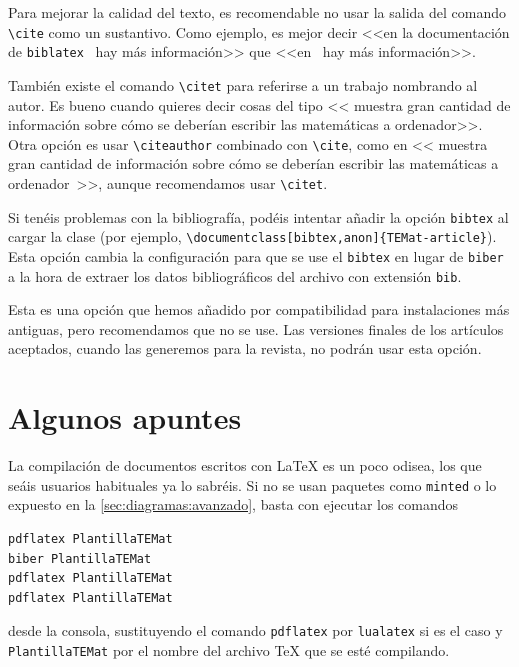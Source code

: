 \documentclass{TEMat-article}
\begin{document}
\begin{nota}
Para mejorar la calidad del texto, es recomendable no usar la salida del comando \verb+\cite+ como un sustantivo.
Como ejemplo, es mejor decir <<en la documentación de \texttt{biblatex}~\cite{biblatex} hay más información>> que <<en~\cite{biblatex} hay más información>>.

También existe el comando \verb+\citet+ para referirse a un trabajo nombrando al autor.
Es bueno cuando quieres decir cosas del tipo <<\citet{bezosOM} muestra gran cantidad de información sobre cómo se deberían escribir las matemáticas a ordenador>>. Otra opción es usar \verb+\citeauthor+ combinado con \verb+\cite+, como en <<\citeauthor{bezosOM} muestra gran cantidad de información sobre cómo se deberían escribir las matemáticas a ordenador~\cite{bezosOM}>>, aunque recomendamos usar \verb+\citet+.
\end{nota}

\begin{nota}
Si tenéis problemas con la bibliografía, podéis intentar añadir la opción \verb+bibtex+ al cargar la clase (por ejemplo, \verb+\documentclass[bibtex,anon]{TEMat-article}+).
Esta opción cambia la configuración para que se use el  \verb+bibtex+ en lugar de \verb+biber+ a la hora de extraer los datos bibliográficos del archivo con extensión \verb+bib+.

Esta es una opción que hemos añadido por compatibilidad para instalaciones más antiguas, pero recomendamos que no se use.
Las versiones finales de los artículos aceptados, cuando las generemos para la revista, no podrán usar esta opción.
\end{nota}

\section{Algunos apuntes}\label{sec:apuntes}
La compilación de documentos escritos con \LaTeX{} es un poco odisea, los que seáis usuarios habituales ya lo sabréis.
Si no se usan paquetes como \verb+minted+ o lo expuesto en la \cref{sec:diagramas:avanzado}, basta con ejecutar los comandos
\begin{verbatim}
pdflatex PlantillaTEMat
biber PlantillaTEMat
pdflatex PlantillaTEMat
pdflatex PlantillaTEMat
\end{verbatim}
desde la consola, sustituyendo el comando \verb+pdflatex+ por \verb+lualatex+ si es el caso y \verb+PlantillaTEMat+ por el nombre del archivo \TeX{} que se esté compilando.
\end{document}
